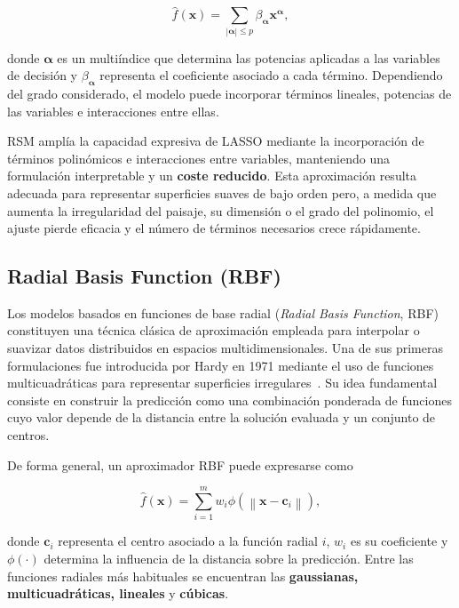 \begin{equation}
    \hat{f}(\mathbf{x})
    =
    \sum_{|\boldsymbol{\alpha}| \leq p}
    \beta_{\boldsymbol{\alpha}}
    \mathbf{x}^{\boldsymbol{\alpha}},
\end{equation}

donde \(\boldsymbol{\alpha}\) es un multiíndice que determina las potencias aplicadas a las variables de decisión y \(\beta_{\boldsymbol{\alpha}}\) representa el coeficiente asociado a cada término. Dependiendo del grado considerado, el modelo puede incorporar términos lineales, potencias de las variables e interacciones entre ellas.

RSM amplía la capacidad expresiva de LASSO mediante la incorporación de términos polinómicos e interacciones entre variables, manteniendo una formulación interpretable y un \textbf{coste reducido}. Esta aproximación resulta adecuada para representar superficies suaves de bajo orden pero, a medida que aumenta la irregularidad del paisaje, su dimensión o el grado del polinomio, el ajuste pierde eficacia y el número de términos necesarios crece rápidamente.

\subsection{Radial Basis Function (RBF)}

Los modelos basados en funciones de base radial (\textit{Radial Basis Function}, RBF) constituyen una técnica clásica de aproximación empleada para interpolar o suavizar datos distribuidos en espacios multidimensionales. Una de sus primeras formulaciones fue introducida por Hardy en 1971 mediante el uso de funciones multicuadráticas para representar superficies irregulares~\cite{hardy1971multiquadric}. Su idea fundamental consiste en construir la predicción como una combinación ponderada de funciones cuyo valor depende de la distancia entre la solución evaluada y un conjunto de centros.

De forma general, un aproximador RBF puede expresarse como

\begin{equation}
    \hat{f}(\mathbf{x})
    =
    \sum_{i=1}^{m}
    w_i
    \phi\left(
    \left\lVert
    \mathbf{x} - \mathbf{c}_i
    \right\rVert
    \right),
\end{equation}

donde \(\mathbf{c}_i\) representa el centro asociado a la función radial \(i\), \(w_i\) es su coeficiente y \(\phi(\cdot)\) determina la influencia de la distancia sobre la predicción. Entre las funciones radiales más habituales se encuentran las \textbf{gaussianas, multicuadráticas, lineales} y \textbf{cúbicas}.

